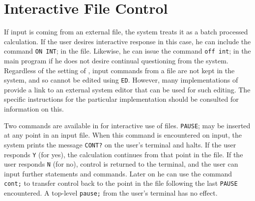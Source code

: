 \section{Interactive File Control}
\hypertarget{switch:INT}{}
If input is coming from an external file, the system treats it as a batch
processed calculation.  If the user desires interactive
 response in this case, he can include the command
\texttt{ON INT}; in the file.  Likewise, he can issue the
command \texttt{off int}; in the main program if he does not desire continual
questioning from the system.  Regardless of the setting of ,
input commands from a file are not kept in the system, and so cannot be
edited using \texttt{ED}.  However, many implementations of {\REDUCE} provide
a link to an external system editor that can be used for such editing.
The specific instructions for the particular implementation should be
consulted for information on this.

\hypertarget{CONT-and-PAUSE}{}
Two commands are available in {\REDUCE} for interactive use of files. 
\texttt{PAUSE}; may be inserted at any point in an input file.  
When this command is encountered on input, the system prints the message 
\texttt{CONT?} on the user's terminal and halts.  If the user responds 
\texttt{Y}
(for yes), the calculation continues from that point in the file.  If the
user responds \texttt{N} (for no), control is returned to the terminal, and
the user can input further statements and commands.  Later on he can use
the command \texttt{cont;} to transfer control back to the
point in the file following the last \texttt{PAUSE} encountered.  A top-level
\texttt{pause;} from the user's terminal has no effect.

